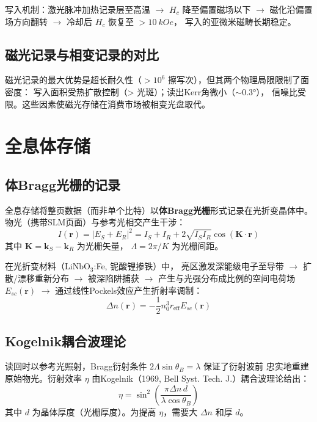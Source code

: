 \documentclass[11pt,a4paper,twoside]{article}
\theoremstyle{definition}\newtheorem{definition}{定义}[section]
\theoremstyle{plain}\newtheorem{theorem}{定理}[section]
\theoremstyle{remark}\newtheorem{remark}{注解}[section]
\begin{document}
写入机制：激光脉冲加热记录层至高温 $\to$ $H_c$ 降至偏置磁场以下
$\to$ 磁化沿偏置场方向翻转 $\to$ 冷却后 $H_c$ 恢复至 $> \SI{10}{kOe}$，
写入的亚微米磁畴长期稳定。

\subsection{磁光记录与相变记录的对比}

磁光记录的最大优势是超长耐久性（$>10^6$ 擦写次），但其两个物理局限限制了面密度：
写入面积受热扩散控制（> 光斑）；读出Kerr角微小（$\sim \ang{0.3}$），
信噪比受限。这些因素使磁光存储在消费市场被相变光盘取代。

\section{全息体存储}
\label{sec:holographic}

\subsection{体Bragg光栅的记录}

全息存储将整页数据（而非单个比特）以\textbf{体Bragg光栅}形式记录在光折变晶体中。
物光（携带SLM页面）与参考光相交产生干涉：
\begin{equation}\label{eq:interference}
  I(\mathbf{r}) = |E_S + E_R|^2 = I_S + I_R + 2\sqrt{I_S I_R} \cos(\mathbf{K}\cdot\mathbf{r})
\end{equation}
其中 $\mathbf{K} = \mathbf{k}_S - \mathbf{k}_R$ 为光栅矢量，
$\Lambda = 2\pi/K$ 为光栅间距。

在光折变材料（LiNbO$_3$:Fe, 铌酸锂掺铁）中，
亮区激发深能级电子至导带 $\to$ 扩散/漂移重新分布
$\to$ 被深陷阱捕获 $\to$ 产生与光强分布成比例的空间电荷场
$E_{sc}(\mathbf{r})$ $\to$ 通过线性Pockels效应产生折射率调制：
\begin{equation}\label{eq:pockels}
  \Delta n(\mathbf{r}) = -\frac{1}{2} n_0^3 r_{\text{eff}} E_{sc}(\mathbf{r})
\end{equation}

\subsection{Kogelnik耦合波理论}

读回时以参考光照射，Bragg衍射条件 $2\Lambda \sin\theta_B = \lambda$ 保证了衍射波前
忠实地重建原始物光。衍射效率 $\eta$ 由Kogelnik（1969, Bell Syst. Tech. J.）耦合波理论给出：
\begin{equation}\label{eq:kogelnik}
  \boxed{ \eta = \sin^2\!\left(
    \frac{\pi \Delta n\, d}{\lambda \cos\theta_B}
  \right) }
\end{equation}
其中 $d$ 为晶体厚度（光栅厚度）。为提高 $\eta$，需要大 $\Delta n$ 和厚 $d$。
\end{document}
